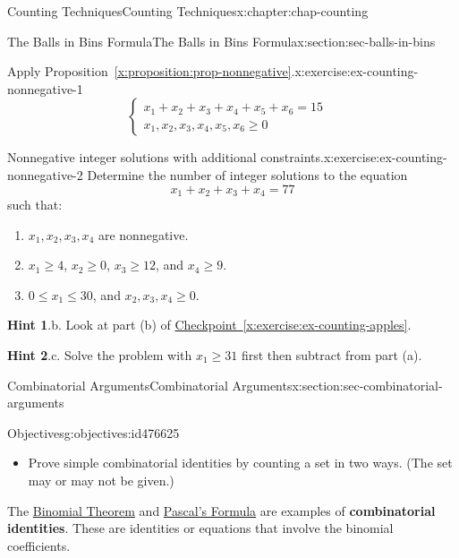 \documentclass[oneside,10pt,]{book}
\newcommand{\blocktitlefont}{\relax}
\newcommand{\xreffont}{\relax}
\newcommand{\terminology}[1]{\textbf{#1}}
\numberwithin{equation}{section}
\newcommand{\amp}{&}
\begin{document}
\begin{chapterptx}{Counting Techniques}{}{Counting Techniques}{}{}{x:chapter:chap-counting}
\begin{sectionptx}{The Balls in Bins Formula}{}{The Balls in Bins Formula}{}{}{x:section:sec-balls-in-bins}
\begin{inlineexercise}{Apply Proposition~{\xreffont\ref*{x:proposition:prop-nonnegative}}.}{x:exercise:ex-counting-nonnegative-1}
\begin{equation*}
\begin{cases}
x_1 + x_2 + x_3 + x_4 + x_5 + x_6 = 15 \amp \\ x_1, x_2, x_3, x_4, x_5, x_6 \geq 0 \amp
\end{cases}
\end{equation*}
%
\end{inlineexercise}
\begin{inlineexercise}{Nonnegative integer solutions with additional constraints.}{x:exercise:ex-counting-nonnegative-2}%
Determine the number of integer solutions to the equation%
\begin{equation*}
x_1 + x_2 + x_3 + x_4 = 77
\end{equation*}
such that:%
\begin{enumerate}[label=(\alph*)]
\item{}\(x_1, x_2, x_3, x_4\) are nonnegative.%
\item{}\(x_1 \geq 4\), \(x_2 \geq 0\), \(x_3 \geq 12\), and \(x_4 \geq 9\).%
\item{}\(0 \leq x_1 \leq 30\), and \(x_2, x_3, x_4 \geq 0\).%
\end{enumerate}
%
\par\smallskip%
\noindent\textbf{\blocktitlefont Hint 1}.\hypertarget{g:hint:id433412}{}\quad{}b. Look at part (b) of \hyperref[x:exercise:ex-counting-apples]{Checkpoint~{\xreffont\ref{x:exercise:ex-counting-apples}}}.%
\par\smallskip%
\noindent\textbf{\blocktitlefont Hint 2}.\hypertarget{g:hint:id433574}{}\quad{}c. Solve the problem with \(x_1 \geq 31\) first then subtract from part (a).%
\end{inlineexercise}
\end{sectionptx}
%
%
\typeout{************************************************}
\typeout{************************************************}
%
\begin{sectionptx}{Combinatorial Arguments}{}{Combinatorial Arguments}{}{}{x:section:sec-combinatorial-arguments}
\begin{objectives}{Objectives}{g:objectives:id476625}
%
\begin{itemize}[label=\textbullet]
\item{}Prove simple combinatorial identities by counting a set in two ways. (The set may or may not be given.)%
\end{itemize}
\end{objectives}
The \hyperref[x:theorem:thm-binomial]{Binomial Theorem} and \hyperref[x:theorem:thm-pascals-formula]{Pascal's Formula} are examples of \terminology{combinatorial identities}. These are identities or equations that involve the binomial coefficients.%

\end{sectionptx}
\end{chapterptx}
\end{document}
